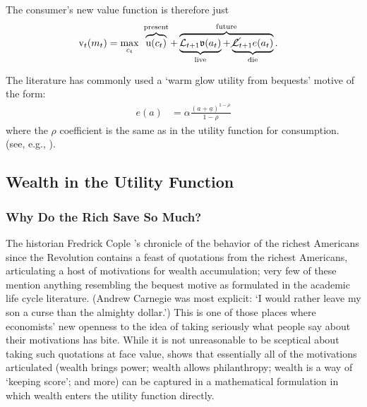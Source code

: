 \documentclass{article}
\newcommand{\CRRA}{\rho}
\newcommand{\uFunc}{\mathrm{u}}
\newcommand{\vFunc}{\mathrm{v}}
\newcommand{\Alive}{\mathcal{L}}
\newcommand{\cNrm}{c}
\newcommand{\aNrm}{a}
\newcommand{\mNrm}{m}
\newcommand{\bqstNrm}{e}
\begin{document}
The consumer's new value function is therefore just
\begin{align}
    {\vFunc}_{t}({\mNrm}_{t}) & = \max_{\cNrm_{t}} ~ \overbrace{\uFunc(\cNrm_{t})}^{\text{present}}+\overbrace{\underbrace{\Alive_{t+1}\mathfrak{v}(\aNrm_{t})}_{\text{live}} + \underbrace{\cancel{\Alive}_{t+1}\bqstNrm({\aNrm}_{t})}_{\text{die}}
    }^{\text{future}}.
\end{align}

The literature has commonly used a `warm glow utility from bequests' motive of the form:
\begin{align}
    \bqstNrm(a) & = \alpha\frac{(a+\underline{a})^{1-\CRRA}}{1-\CRRA}
\end{align}
where the $\CRRA$ coefficient is the same as in the utility function for consumption.
(see, e.g., \cite{deNardiBequest}).



\subsection{Wealth in the Utility Function}

\subsubsection{Why Do the Rich Save So Much?}

The historian Fredrick Cople \cite{jaherGilded}'s chronicle of the behavior of the richest Americans since the Revolution contains a feast of quotations from the richest Americans, articulating a host of motivations for wealth accumulation; very few of these mention anything resembling the bequest motive as formulated in the academic life cycle literature.  (Andrew Carnegie was most explicit: `I would rather leave my son a curse than the almighty dollar.')  This is one of those places where economists' new openness to the idea of taking seriously what people say about their motivations has bite. While it is not unreasonable to be sceptical about taking such quotations at face value, \cite{WhyDoTheRich} shows that essentially all of the motivations articulated (wealth brings power; wealth allows philanthropy; wealth is a way of `keeping score'; and more) can be captured in a mathematical formulation in which wealth enters the utility function directly.
\end{document}
